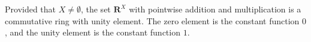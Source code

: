 Provided that $X \neq \emptyset$, the set $\mathbf{R}^X$ with pointwise addition and multiplication is a commutative ring with unity element. The zero element is the constant function $0$, and the unity element is the constant function $1$.
